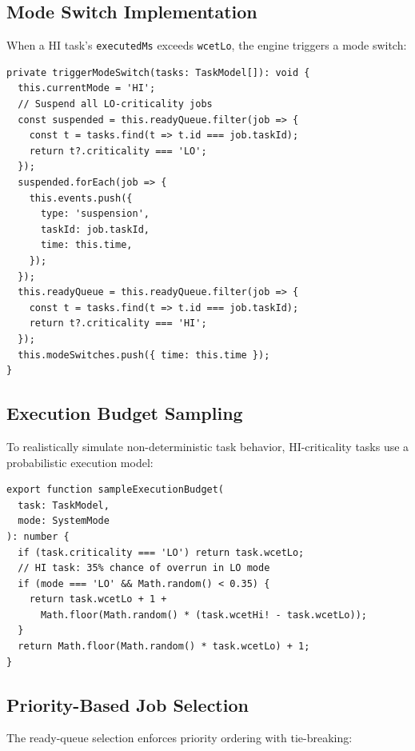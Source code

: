 \documentclass[conference]{IEEEtran}
\begin{document}
\subsection{Mode Switch Implementation}

When a HI task's \texttt{executedMs} exceeds \texttt{wcetLo}, the engine triggers a mode switch:

\begin{lstlisting}[caption={Mode switch logic (SchedulerEngine.ts)},label={lst:modeswitch}]
private triggerModeSwitch(tasks: TaskModel[]): void {
  this.currentMode = 'HI';
  // Suspend all LO-criticality jobs
  const suspended = this.readyQueue.filter(job => {
    const t = tasks.find(t => t.id === job.taskId);
    return t?.criticality === 'LO';
  });
  suspended.forEach(job => {
    this.events.push({
      type: 'suspension',
      taskId: job.taskId,
      time: this.time,
    });
  });
  this.readyQueue = this.readyQueue.filter(job => {
    const t = tasks.find(t => t.id === job.taskId);
    return t?.criticality === 'HI';
  });
  this.modeSwitches.push({ time: this.time });
}
\end{lstlisting}

\subsection{Execution Budget Sampling}

To realistically simulate non-deterministic task behavior, HI-criticality tasks use a probabilistic execution model:

\begin{lstlisting}[caption={Execution budget sampling (TaskModel.ts)},label={lst:sampling}]
export function sampleExecutionBudget(
  task: TaskModel,
  mode: SystemMode
): number {
  if (task.criticality === 'LO') return task.wcetLo;
  // HI task: 35% chance of overrun in LO mode
  if (mode === 'LO' && Math.random() < 0.35) {
    return task.wcetLo + 1 +
      Math.floor(Math.random() * (task.wcetHi! - task.wcetLo));
  }
  return Math.floor(Math.random() * task.wcetLo) + 1;
}
\end{lstlisting}

\subsection{Priority-Based Job Selection}

The ready-queue selection enforces priority ordering with tie-breaking:
\end{document}
